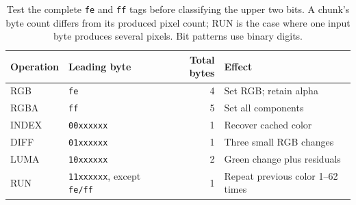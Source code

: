 \begin{table}[htbp]
  \centering
  \begin{tabular}{l l r l}
    \toprule
    Operation & Leading byte                             & Total bytes & Effect                            \\
    \midrule
    RGB       & \texttt{fe}                              & 4           & Set RGB; retain alpha             \\
    RGBA      & \texttt{ff}                              & 5           & Set all components                \\
    INDEX     & \texttt{00xxxxxx}                        & 1           & Recover cached color              \\
    DIFF      & \texttt{01xxxxxx}                        & 1           & Three small RGB changes           \\
    LUMA      & \texttt{10xxxxxx}                        & 2           & Green change plus residuals       \\
    RUN       & \texttt{11xxxxxx}, except \texttt{fe/ff} & 1           & Repeat previous color 1--62 times \\
    \bottomrule
  \end{tabular}
  \caption{Test the complete \texttt{fe} and \texttt{ff} tags before classifying the upper two bits. A chunk's byte count differs from its produced pixel count; RUN is the case where one input byte produces several pixels. Bit patterns use binary digits.}
  \label{tab:revision-qoi-tags}
\end{table}
